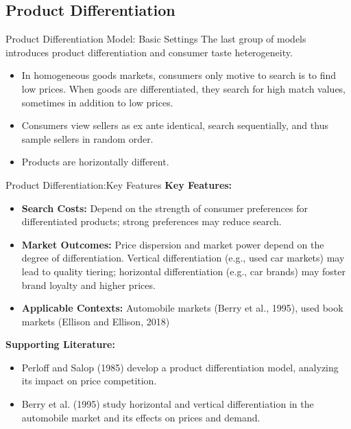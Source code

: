 \documentclass[aspectratio=169]{beamer}  %
\begin{document}
\subsection{Product Differentiation}
\begin{frame}{Product Differentiation Model: Basic Settings}
    The last group of models introduces product differentiation and consumer taste heterogeneity.
    \begin{itemize}
        \item In homogeneous goods markets, consumers only motive to search is to find low prices. When goods are differentiated, they search for high match values, sometimes in addition to low prices.
        \item Consumers view sellers as ex ante identical, search sequentially, and thus sample sellers in random order.
        \item Products are horizontally different.
    \end{itemize}
\end{frame}

\begin{frame}{Product Differentiation:Key Features}
    \textbf{Key Features:}
    \begin{itemize}
        \item \textbf{Search Costs:} Depend on the strength of consumer preferences for differentiated products; strong preferences may reduce search.
        \item \textbf{Market Outcomes:} Price dispersion and market power depend on the degree of differentiation. Vertical differentiation (e.g., used car markets) may lead to quality tiering; horizontal differentiation (e.g., car brands) may foster brand loyalty and higher prices.
        \item \textbf{Applicable Contexts:} Automobile markets (Berry et al., 1995), used book markets (Ellison and Ellison, 2018)
    \end{itemize}
    \textbf{Supporting Literature:}
    \begin{itemize}
        \item Perloff and Salop (1985) develop a product differentiation model, analyzing its impact on price competition.
        \item Berry et al. (1995) study horizontal and vertical differentiation in the automobile market and its effects on prices and demand.
    \end{itemize}
\end{frame}
\end{document}

